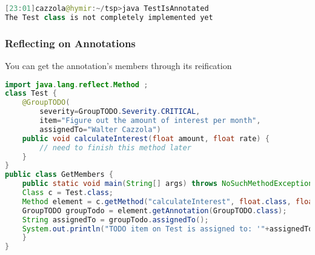 \begin{lstlisting}[language=Java]
[23:01]cazzola@hymir:~/tsp>java TestIsAnnotated
The Test class is not completely implemented yet
\end{lstlisting}

\subsubsection{Reflecting on Annotations}

You can get the annotation’s members through its reification

\begin{lstlisting}[language=Java]
import java.lang.reflect.Method ;
class Test {
	@GroupTODO(
		severity=GroupTODO.Severity.CRITICAL,
		item="Figure out the amount of interest per month",
		assignedTo="Walter Cazzola")
	public void calculateInterest(float amount, float rate) {
		// need to finish this method later
	}
}
public class GetMembers {
	public static void main(String[] args) throws NoSuchMethodException {
	Class c = Test.class;
	Method element = c.getMethod("calculateInterest", float.class, float.class);
	GroupTODO groupTodo = element.getAnnotation(GroupTODO.class);
	String assignedTo = groupTodo.assignedTo();
	System.out.println("TODO item on Test is assigned to: '"+assignedTo+"'.");
	}
}
\end{lstlisting}



























